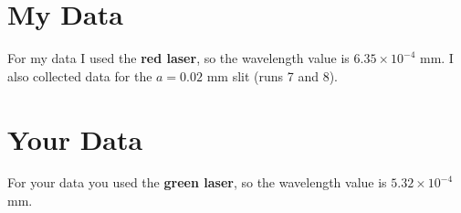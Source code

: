 \section{My Data}
%
For my data I used the \textbf{red laser}, so the wavelength value is $6.35 \times 10^{-4}$ mm. I also collected data for the $a = 0.02$ mm slit (runs 7 and 8).
%
\section{Your Data}
%
For your data you used the \textbf{green laser}, so the wavelength value is $5.32 \times 10^{-4}$ mm.
%
%
\newpage
